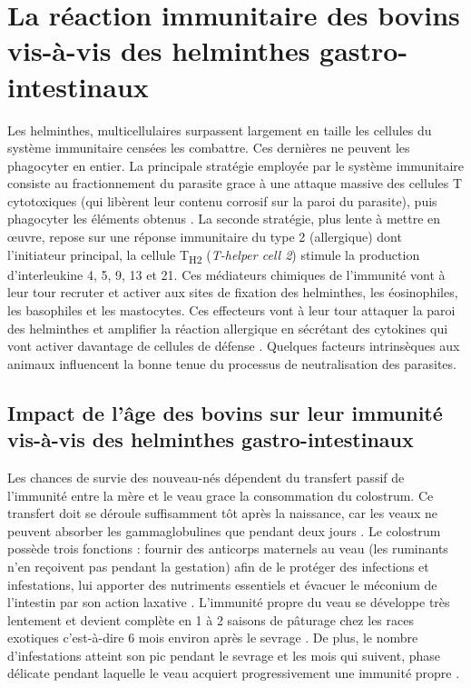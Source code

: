 \section{La réaction immunitaire des bovins vis-à-vis des helminthes gastro-intestinaux}
Les helminthes, multicellulaires surpassent largement en taille les cellules du système 
immunitaire censées les combattre. Ces dernières ne peuvent les phagocyter en entier. 
La principale stratégie employée par le système immunitaire consiste au fractionnement 
du parasite grace à une attaque massive des cellules T cytotoxiques (qui libèrent leur 
contenu corrosif sur la paroi du parasite), puis phagocyter les éléments obtenus 
. La seconde stratégie, plus lente à mettre en œuvre, repose sur une 
réponse immunitaire du type 2 (allergique) dont l'initiateur principal, la cellule 
T\textsubscript{H2} (\textit{T-helper cell 2}) stimule la production d'interleukine 
4, 5, 9, 13 et 21. Ces médiateurs chimiques de l'immunité vont à leur tour recruter 
et activer aux sites de fixation des helminthes, les éosinophiles, les basophiles et 
les mastocytes. Ces effecteurs vont à leur tour attaquer la paroi des helminthes et 
amplifier la réaction allergique en sécrétant des cytokines qui vont activer davantage 
de cellules de défense .
Quelques facteurs intrinsèques aux animaux influencent la bonne tenue du processus de 
neutralisation des parasites.

\subsection{Impact de l'âge des bovins sur leur immunité vis-à-vis des helminthes 
gastro-intestinaux}
Les chances de survie des nouveau-nés dépendent du transfert passif de l'immunité 
entre la mère et le veau grace la consommation du colostrum. Ce transfert doit se 
déroule suffisamment tôt après la naissance, car les veaux ne peuvent absorber les 
gammaglobulines que pendant deux jours . Le colostrum possède trois 
fonctions : fournir des anticorps maternels au veau (les ruminants n'en reçoivent pas 
pendant la gestation) afin de le protéger des infections et infestations, lui apporter 
des nutriments essentiels et évacuer le méconium de l'intestin par son action 
laxative . L'immunité propre du veau se développe très lentement 
et devient complète en 1 à 2 saisons de pâturage chez les races exotiques c'est-à-dire 
6 mois environ après le sevrage . De plus, le nombre d'infestations 
atteint son pic pendant le sevrage et les mois qui suivent, phase délicate pendant 
laquelle le veau acquiert progressivement une immunité propre .

